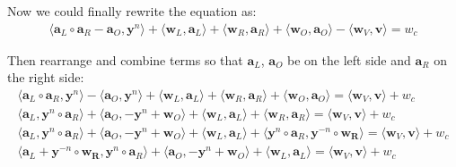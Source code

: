 \documentclass[../lecture-notes-148x210.tex]{subfiles}
\begin{document}
Now we could finally rewrite the equation as:
\begin{equation*}
    \begin{aligned}
        \langle \mathbf{a}_L \circ \mathbf{a}_R - \mathbf{a}_O, \mathbf{y}^n \rangle + \langle \mathbf{w}_L, \mathbf{a}_L \rangle + \langle \mathbf{w}_R, \mathbf{a}_R \rangle + \langle \mathbf{w}_O, \mathbf{a}_O \rangle - \langle \mathbf{w}_V, \mathbf{v} \rangle = w_c
    \end{aligned}
\end{equation*}

Then rearrange and combine terms so that $\mathbf{a}_L$, $\mathbf{a}_O$ be on the left side and $\mathbf{a}_R$ on the right side:
\begin{equation*}
    \begin{aligned}
        \langle \mathbf{a}_L \circ \mathbf{a}_R, \mathbf{y}^n \rangle - \langle \mathbf{a}_O, \mathbf{y}^n \rangle + \langle \mathbf{w}_L, \mathbf{a}_L \rangle + \langle \mathbf{w}_R, \mathbf{a}_R \rangle + \langle \mathbf{w}_O, \mathbf{a}_O \rangle = \langle \mathbf{w}_V, \mathbf{v} \rangle + w_c \\
        \langle \mathbf{a}_L, \mathbf{y}^n \circ \mathbf{a}_R \rangle + \langle \mathbf{a}_O, - \mathbf{y}^n + \mathbf{w}_O \rangle + \langle \mathbf{w}_L, \mathbf{a}_L \rangle + \langle \mathbf{w}_R, \mathbf{a}_R \rangle = \langle \mathbf{w}_V, \mathbf{v} \rangle + w_c \\
        \langle \mathbf{a}_L, \mathbf{y}^n \circ \mathbf{a}_R \rangle + \langle \mathbf{a}_O, - \mathbf{y}^n + \mathbf{w}_O \rangle + \langle \mathbf{w}_L, \mathbf{a}_L \rangle + \langle \mathbf{y}^n \circ \mathbf{a}_R, \mathbf{y}^{-n} \circ \mathbf{w_R} \rangle = \langle \mathbf{w}_V, \mathbf{v} \rangle + w_c \\
        \langle \mathbf{a}_L + \mathbf{y}^{-n} \circ \mathbf{w_R}, \mathbf{y}^n \circ \mathbf{a}_R \rangle + \langle \mathbf{a}_O, - \mathbf{y}^n + \mathbf{w}_O \rangle + \langle \mathbf{w}_L, \mathbf{a}_L \rangle = \langle \mathbf{w}_V, \mathbf{v} \rangle + w_c \\
    \end{aligned}
\end{equation*}
\end{document}
